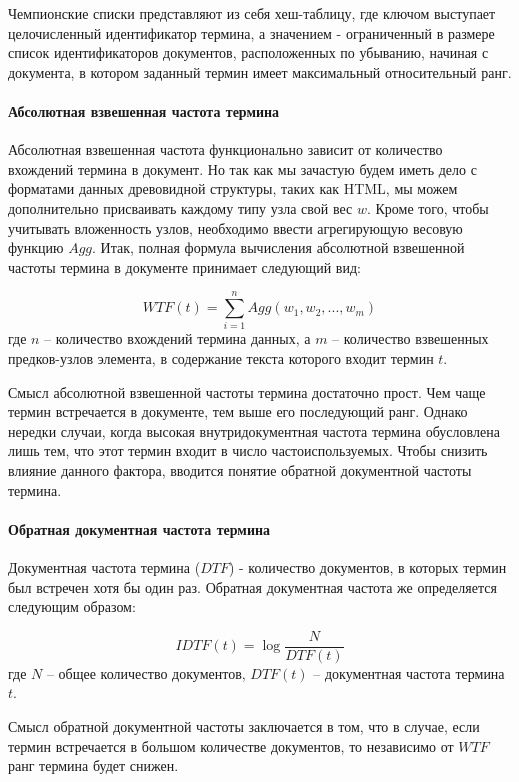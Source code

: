 Чемпионские списки представляют из себя хеш-таблицу, где ключом выступает целочисленный идентификатор термина, а значением - ограниченный в размере список идентификаторов документов, расположенных по убыванию, начиная с документа, в котором заданный термин имеет максимальный относительный ранг. 

\paragraph{Абсолютная взвешенная частота термина}

Абсолютная взвешенная частота функционально зависит от количество вхождений термина в документ. Но так как мы зачастую будем иметь дело с форматами данных древовидной структуры, таких как HTML, мы можем дополнительно присваивать каждому типу узла свой вес $w$. Кроме того, чтобы учитывать вложенность узлов, необходимо ввести агрегирующую весовую функцию $Agg$. Итак, полная формула вычисления абсолютной взвешенной частоты термина в документе принимает следующий вид:

\begin{equation}
WTF(t) = \sum_{i = 1}^{n}Agg(w_1, w_2, ..., w_m)
\end{equation} где $n$ -- количество вхождений термина данных, а $m$ -- количество взвешенных предков-узлов элемента, в содержание текста которого входит термин $t$.

Смысл абсолютной взвешенной частоты термина достаточно прост. Чем чаще термин встречается в документе, тем выше его последующий ранг. Однако нередки случаи, когда высокая внутридокументная частота термина обусловлена лишь тем, что этот термин входит в число частоиспользуемых. Чтобы снизить влияние данного фактора, вводится понятие обратной документной частоты термина.

\paragraph{Обратная документная частота термина}

Документная частота термина ($DTF$) - количество документов, в которых термин был встречен хотя бы один раз. Обратная документная частота же определяется следующим образом:

\begin{equation}
IDTF(t) = \log\frac{N}{DTF(t)}
\end{equation} где $N$ -- общее количество документов, $DTF(t)$ -- документная частота термина $t$.

Смысл обратной документной частоты заключается в том, что в случае, если термин встречается в большом количестве документов, то независимо от $WTF$ ранг термина будет снижен.

